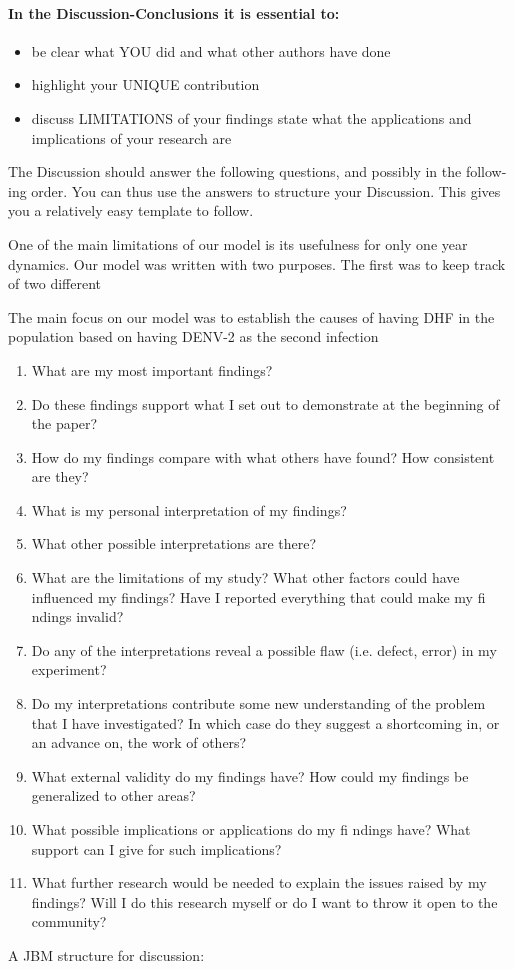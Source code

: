 \paragraph{In the Discussion-Conclusions it is essential to:}

\begin{itemize}
	\item
		be clear what YOU did and what other authors have done
	\item
		highlight your UNIQUE contribution
	
	\item
		discuss LIMITATIONS of your findings state what the
		 applications and implications of your research are
\end{itemize}

The Discussion should answer the following questions, and possibly in the follow-
ing order. You can thus use the answers to structure your Discussion. This gives you
a relatively easy template to follow.

\noindent One of the main limitations of our model is its usefulness for only one year dynamics. 
Our model was written with two purposes. The first was to keep track of two different 

The main focus on our model was to establish the causes of having DHF in the population based on
having DENV-2 as the second infection 



\begin{enumerate}
	\item
		What are my most important findings?
	\item
		Do these findings support what I set out to demonstrate at the beginning of the
		paper?
	\item
		How do my findings compare with what others have found? How consistent are
		they?
	\item
		What is my personal interpretation of my findings?
	\item
		What other possible interpretations are there?
	\item
		What are the limitations of my study? What other factors could have influenced
		my findings? Have I reported everything that could make my fi ndings invalid?
	\item
		Do any of the interpretations reveal a possible flaw (i.e. defect, error) in my
		experiment?
	\item
		Do my interpretations contribute some new understanding of the problem that I
		have investigated? In which case do they suggest a shortcoming in, or an
		advance on, the work of others?
	\item
		What external validity do my findings have? How could my findings be 
		generalized to other areas?
	\item
		What possible implications or applications do my fi ndings have? What support
		can I give for such implications?
	\item
		What further research would be needed to explain the issues raised by my 
		findings? Will I do this research myself or do I want to throw it open to the
		community?
\end{enumerate}
A JBM structure for discussion:
